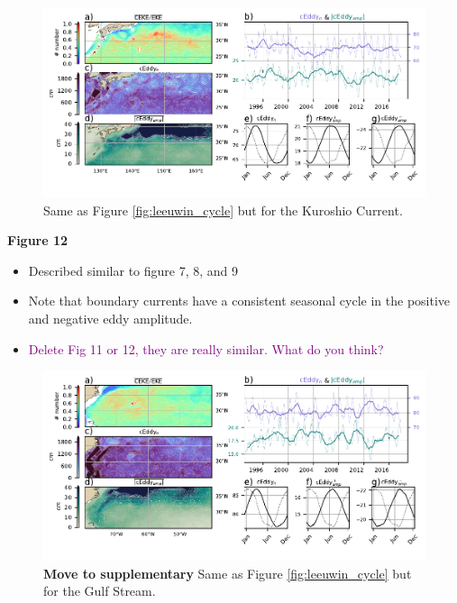 \documentclass[draft,linenumbers]{agujournal2019}
\begin{document}
	\begin{figure}
	    \centering
	    \includegraphics[width=1\textwidth]{figures/regional_ratios_and_stats_V3_4.pdf}
	    \caption{Same as Figure \ref{fig:leeuwin_cycle} but for the Kuroshio Current.}
	    \label{fig:south_atlantic_cycle}
	\end{figure}

	\textbf{Figure 12}
	\begin{itemize}
		\item Described similar to figure 7, 8, and 9
		\item Note that boundary currents have a consistent seasonal cycle in the positive and negative eddy amplitude.
		\item \textcolor{purple}{Delete Fig 11 or 12, they are really similar. What do you think?}
	\end{itemize}

	\begin{figure}
	    \centering
	    \includegraphics[width=1\textwidth]{figures/regional_ratios_and_stats_V3_5.pdf}
	    \caption{\textbf{Move to supplementary} Same as Figure \ref{fig:leeuwin_cycle} but for the Gulf Stream.}
	    \label{fig:south_atlantic_cycle}
	\end{figure}
\end{document}
